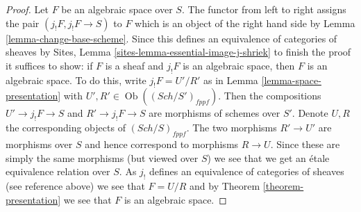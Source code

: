 \documentclass[10pt,a4paper]{amsart}
\theoremstyle{plain}
\theoremstyle{definition}
\theoremstyle{remark}
\numberwithin{equation}{subsection}
\def\Sch{\mathit{Sch}}
\def\Ob{\mathop{\mathrm{Ob}}\nolimits}
\begin{document}
\begin{proof}
Let $F$ be an algebraic space over $S$. The functor from left to right
assigns the pair $(j_!F, j_!F \to S)$ to $F$
which is an object of the right hand side by
Lemma \ref{lemma-change-base-scheme}.
Since this defines an equivalence of categories of sheaves by
Sites, Lemma \ref{sites-lemma-essential-image-j-shriek}
to finish the proof it suffices to show:
if $F$ is a sheaf and $j_!F$ is an algebraic space, then $F$
is an algebraic space. To do this, write
$j_!F = U'/R'$ as in
Lemma \ref{lemma-space-presentation}
with $U', R' \in \Ob((\Sch/S')_{fppf})$.
Then the compositions $U' \to j_!F \to S$ and $R' \to j_!F \to S$
are morphisms of schemes over $S'$. Denote $U, R$ the corresponding
objects of $(\Sch/S)_{fppf}$. The two morphisms
$R' \to U'$ are morphisms over $S$ and hence correspond to
morphisms $R \to U$. Since these are simply the same
morphisms (but viewed over $S$) we see that we get an \'etale
equivalence relation over $S$. As $j_!$ defines an equivalence of
categories of sheaves (see reference above) we see that
$F = U/R$ and by
Theorem \ref{theorem-presentation}
we see that $F$ is an algebraic space.
\end{proof}
\end{document}
